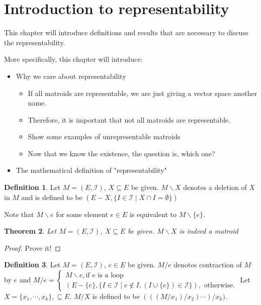 \documentclass[psamsfonts]{amsart}
\newtheorem{thm}{Theorem}[section]
\theoremstyle{definition}
\newtheorem{defn}[thm]{Definition}
\theoremstyle{remark}
\numberwithin{equation}{section}
\begin{document}
\section{Introduction to representability}

This chapter will introduce definitions and results that are necessary to discuss the representability.

More specifically, this chapter will introduce:
\begin{itemize}
\item Why we care about representability
  \begin{itemize}
  \item If all matroids are representable, we are just giving a vector space another name.
  \item Therefore, it is important that not all matroids are representable.
  \item Show some examples of unrepresentable matroids
  \item Now that we know the existence, the question is, which one?
  \end{itemize}
\item The mathematical definition of "representability"
\end{itemize}


\begin{defn}
Let $M = (E, \mathcal{I})$, $X \subseteq E$ be given.
$M \backslash X$ denotes a deletion of $X$ in $M$ and is defined to be $(E - X, \{ I \in \mathcal{I} \mid X \cap I = \emptyset \})$
\end{defn}

Note that $M \backslash e$ for some element $e \in E$ is equivalent to $M \backslash \{ e \}$.

\begin{thm}
Let $M = (E, \mathcal{I})$, $X \subseteq E$ be given.
$M \backslash X$ is indeed a matroid
\end{thm}

\begin{proof}
Prove it!
\end{proof}

\begin{defn}
Let $M = (E, \mathcal{I})$, $e \in E$ be given.
$M / e$ denotes contraction of $M$ by $e$ and 
$M / e = \begin{cases}
      M \backslash e, \text{if $e$ is a loop}\\
      (E - \{ e \}, \{ I \in \mathcal{I} \mid e \notin I, (I \cup \{ e \}) \in \mathcal{I}\}), \text{ otherwise}.
         \end{cases}$
Let $X = \{ x_1, \cdots, x_k \}, \subseteq E$.
$M / X$ is defined to be $(((M/x_1)/x_2) \cdots)/x_k)$.
\end{defn}
\end{document}
